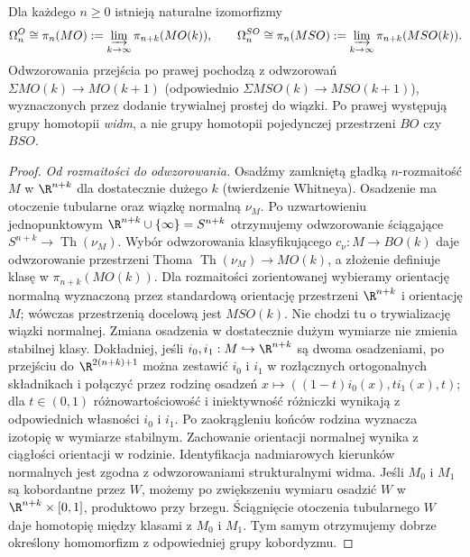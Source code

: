 \begin{twierdzenie}
\label{thm:pt-MO-v9}
Dla każdego $n\ge0$ istnieją naturalne izomorfizmy
\[
\Omega_n^O\cong\pi_n(MO):=
\varinjlim_{k\to\infty}\pi_{n+k}(MO(k)),
\qquad
\Omega_n^{SO}\cong\pi_n(MSO):=
\varinjlim_{k\to\infty}\pi_{n+k}(MSO(k)).
\]
Odwzorowania przejścia po prawej pochodzą z odwzorowań
$\Sigma MO(k)\to MO(k+1)$ (odpowiednio
$\Sigma MSO(k)\to MSO(k+1)$), wyznaczonych
przez dodanie trywialnej prostej do wiązki.
Po prawej występują grupy homotopii \emph{widm},
a nie grupy homotopii pojedynczej przestrzeni $BO$
czy $BSO$.
\end{twierdzenie}
\begin{proof}
\emph{Od rozmaitości do odwzorowania.}
Osadźmy zamkniętą gładką $n$-rozmaitość
$M$ w $\R^{n+k}$ dla dostatecznie dużego $k$
(twierdzenie Whitneya). Osadzenie ma otoczenie
tubularne oraz wiązkę normalną $\nu_M$.
Po uzwartowieniu jednopunktowym
$\R^{n+k}\cup\{\infty\}=S^{n+k}$ otrzymujemy odwzorowanie ściągające
$S^{n+k}\to\operatorname{Th}(\nu_M)$.
Wybór odwzorowania klasyfikującego
$c_\nu:M\to BO(k)$ daje odwzorowanie przestrzeni
Thoma $\operatorname{Th}(\nu_M)\to MO(k)$,
a złożenie definiuje klasę w $\pi_{n+k}(MO(k))$.
Dla rozmaitości zorientowanej wybieramy orientację normalną
wyznaczoną przez standardową orientację przestrzeni
$\R^{n+k}$ i orientację $M$; wówczas przestrzenią docelową jest
$MSO(k)$. Nie chodzi tu o trywializację wiązki normalnej.
Zmiana osadzenia w dostatecznie dużym wymiarze nie
zmienia stabilnej klasy. Dokładniej, jeśli
$i_0,i_1:M\hookrightarrow\R^{n+k}$ są dwoma osadzeniami,
po przejściu do $\R^{2(n+k)+1}$ można zestawić
$i_0$ i $i_1$ w rozłącznych ortogonalnych składnikach
i połączyć przez rodzinę osadzeń
$x\mapsto((1-t)i_0(x),t i_1(x),t)$; dla $t\in(0,1)$
różnowartościowość i iniektywność różniczki wynikają
z odpowiednich własności $i_0$ i $i_1$.
Po zaokrągleniu końców rodzina wyznacza izotopię
w wymiarze stabilnym. Zachowanie orientacji
normalnej wynika z ciągłości orientacji w rodzinie.
Identyfikacja nadmiarowych kierunków normalnych
jest zgodna z odwzorowaniami strukturalnymi widma.
Jeśli $M_0$ i $M_1$ są kobordantne przez $W$,
możemy po zwiększeniu wymiaru osadzić $W$ w
$\R^{n+k}\times[0,1]$, produktowo przy brzegu.
Ściągnięcie otoczenia tubularnego $W$ daje homotopię
między klasami z $M_0$ i $M_1$. Tym samym
otrzymujemy dobrze określony homomorfizm z
odpowiedniej grupy kobordyzmu.


\end{proof}
